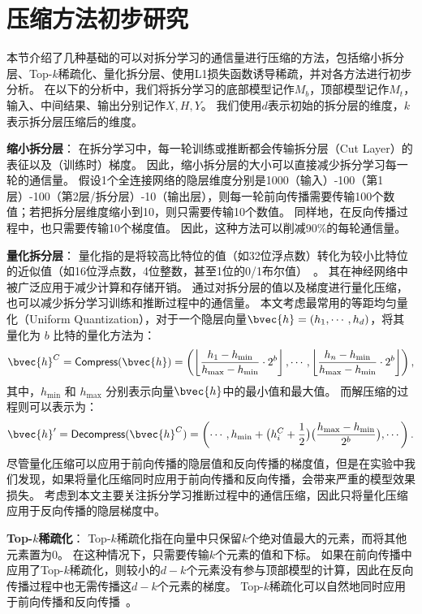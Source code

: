 \section{压缩方法初步研究}
本节介绍了几种基础的可以对拆分学习的通信量进行压缩的方法，包括缩小拆分层、Top-$k$稀疏化、量化拆分层、使用L1损失函数诱导稀疏，并对各方法进行初步分析。
%
在以下的分析中，我们将拆分学习的底部模型记作$M_b$，顶部模型记作$M_t$，输入、中间结果、输出分别记作$X, H, Y$。
我们使用$d$表示初始的拆分层的维度，$k$表示拆分层压缩后的维度。


\textbf{缩小拆分层}：
在拆分学习中，每一轮训练或推断都会传输拆分层（Cut Layer）的表征以及（训练时）梯度。
%
因此，缩小拆分层的大小可以直接减少拆分学习每一轮的通信量。
%
假设1个全连接网络的隐层维度分别是1000（输入）-100（第1层）-100（第2层/拆分层）-10（输出层），则每一轮前向传播需要传输100个数值；若把拆分层维度缩小到10，则只需要传输10个数值。
%
同样地，在反向传播过程中，也只需要传输10个梯度值。
%
因此，这种方法可以削减90\%的每轮通信量。

\textbf{量化拆分层}：
量化指的是将较高比特位的值（如32位浮点数）转化为较小比特位的近似值（如16位浮点数，4位整数，甚至1位的0/1布尔值）~\cite{zhou2016dorefa,banner2018_8bit,yang2019quantization}。
%
其在神经网络中被广泛应用于减少计算和存储开销。
%
通过对拆分层的值以及梯度进行量化压缩，也可以减少拆分学习训练和推断过程中的通信量。
%
本文考虑最常用的等距均匀量化（Uniform Quantization），对于一个隐层向量$\bvec{h} = (h_1, \cdots, h_d)$，将其量化为 $b$ 比特的量化方法为：
\begin{equation}
    \bvec{h}^C = \mathsf{Compress}(\bvec{h}) = \left( \left\lfloor \dfrac{h_1 - h_\text{min}}{h_\text{max} - h_\text{min}} \cdot  2^b \right\rfloor, \cdots, \left\lfloor \dfrac{h_n - h_\text{min}}{h_\text{max} - h_\text{min}} \cdot 2^b \right\rfloor \right),
\end{equation}
其中，$h_\text{min}$ 和 $h_\text{max}$ 分别表示向量$\bvec{h}$中的最小值和最大值。
%
而解压缩的过程则可以表示为：
\begin{equation}
    \bvec{h}' = \mathsf{Decompress}(\bvec{h}^C) = \left(\cdots, h_\text{min} + \big(h^C_i + \dfrac12 \big) \big(\dfrac{h_\text{max} - h_\text{min}}{2^b}\big), \cdots \right).
\end{equation}
% 
尽管量化压缩可以应用于前向传播的隐层值和反向传播的梯度值，但是在实验中我们发现，如果将量化压缩同时应用于前向传播和反向传播，会带来严重的模型效果损失。
%
考虑到本文主要关注拆分学习推断过程中的通信压缩，因此只将量化压缩应用于反向传播的隐层梯度中。

\textbf{Top-$k$稀疏化}：
Top-$k$稀疏化指在向量中只保留$k$个绝对值最大的元素，而将其他元素置为0。
%
在这种情况下，只需要传输$k$个元素的值和下标。
%
如果在前向传播中应用了Top-$k$稀疏化，则较小的$d-k$个元素没有参与顶部模型的计算，因此在反向传播过程中也无需传播这$d-k$个元素的梯度。
%
Top-$k$稀疏化可以自然地同时应用于前向传播和反向传播~\cite{jayakumar_2020_topkast}。
%

